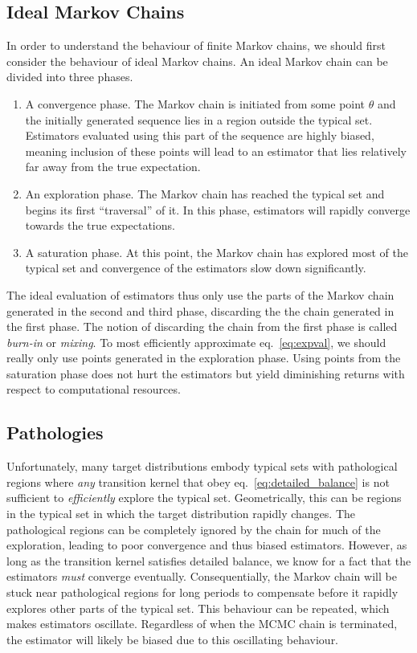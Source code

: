 \subsection{Ideal Markov Chains}
In order to understand the behaviour of finite Markov chains, we should first 
consider the behaviour of ideal Markov chains.
An ideal Markov chain can be divided into three phases.
\begin{enumerate}
    \item A convergence phase. The Markov chain is initiated from some point $\theta$ and the initially generated sequence
    lies in a region outside the typical set. Estimators evaluated using this part of the sequence are highly biased,
    meaning inclusion of these points will lead to an estimator that lies relatively far away from the true expectation.
    \item An exploration phase. The Markov chain has reached the typical set and begins its first ``traversal'' of it.
    In this phase, estimators will rapidly converge towards the true expectations.
    \item A saturation phase. At this point, the Markov chain has explored most of the typical set and convergence
    of the estimators slow down significantly. 
\end{enumerate}
The ideal evaluation of estimators thus only use the parts of the Markov chain generated in the second and third phase, discarding the
the chain generated in the first phase. The notion of discarding the chain from the first phase is called \textit{burn-in} or \textit{mixing}.
To most efficiently approximate eq.~\eqref{eq:expval}, we should really only use points generated in the exploration phase.
Using points from the saturation phase does not hurt the estimators but yield diminishing returns
with respect to computational resources.

\subsection{Pathologies}
Unfortunately, many target distributions embody typical sets with pathological regions where \textit{any} 
transition kernel that obey eq.~\eqref{eq:detailed_balance} is not sufficient to \textit{efficiently} explore the typical set.
Geometrically, this can be regions in the typical set in which the target distribution rapidly changes.
The pathological regions can be completely ignored by the chain for much of the exploration,
leading to poor convergence and thus biased estimators. However, as long as the transition kernel
satisfies detailed balance, we know for a fact that the estimators \textit{must} converge eventually.
Consequentially, the Markov chain will be stuck near pathological regions for long periods to compensate
before it rapidly explores other parts of the typical set. This behaviour can be repeated, 
which makes estimators oscillate. Regardless of when the MCMC chain is terminated, the estimator will likely be biased due
to this oscillating behaviour.

